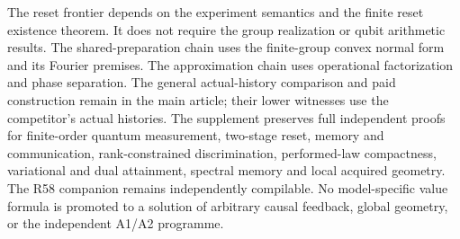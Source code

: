 The reset frontier depends on the experiment semantics and the finite
reset existence theorem.  It does not require the group realization or
qubit arithmetic results.  The shared-preparation chain uses the
finite-group convex normal form and its Fourier premises.  The
approximation chain uses operational factorization and phase separation.
The general actual-history comparison and paid construction remain in
the main article; their lower witnesses use the competitor's actual
histories.  The supplement preserves full independent proofs for
finite-order quantum measurement, two-stage reset, memory and
communication, rank-constrained discrimination, performed-law
compactness, variational and dual attainment, spectral memory and local
acquired geometry.  The R58 companion remains independently compilable.
No model-specific value formula is promoted to a solution of arbitrary
causal feedback, global geometry, or the independent A1/A2 programme.
